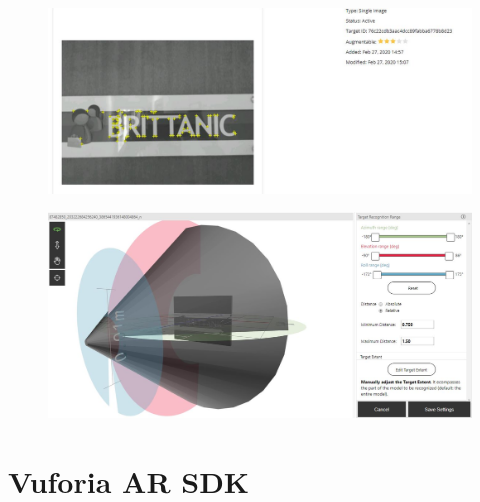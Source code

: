 \documentclass{aifyp}
\begin{document}
\begin{appendices}
\begin{figure}[H]
\begin{minipage}{.5\textwidth}
          \label{fig:test6}
        \end{minipage}
    \end{figure}
    \begin{figure}[H]
    \centering
        \begin{minipage}{.5\textwidth}
          \centering
          \includegraphics[scale=0.5]{Images/Chapter5/ImageTarget.JPG}
          \label{fig:test7}
        \end{minipage}%
    \end{figure}
    \begin{figure}[H]
    \centering
          \includegraphics[scale=0.4]{Images/Chapter5/ModelTarget.JPG}
          \label{fig:test8}
    \end{figure}
\newpage
\section{Vuforia AR SDK}
\begin{figure}[H]
    \centering


\end{figure}
\end{appendices}
\end{document}
